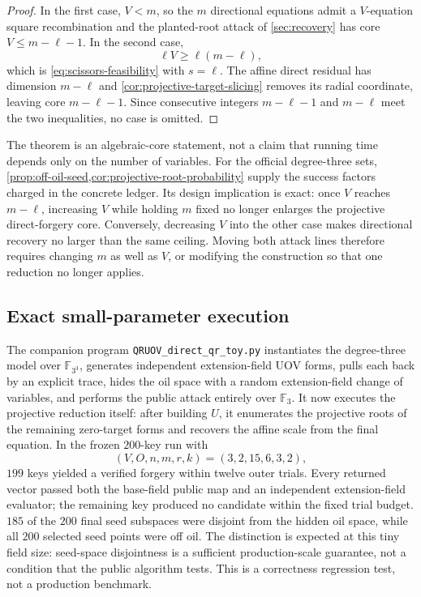 \documentclass[11pt,a4paper]{article}
\theoremstyle{definition}
\theoremstyle{remark}
\newcommand{\F}{\mathbb F}
\begin{document}
\begin{proof}
In the first case, $V<m$, so the $m$ directional equations admit a
$V$-equation square recombination and the planted-root attack of
\cref{sec:recovery} has core $V\le m-\ell-1$.  In the second case,
\[
 \ell V\ge\ell(m-\ell),
\]
which is \eqref{eq:scissors-feasibility} with $s=\ell$.  The affine direct
residual has dimension $m-\ell$ and
\cref{cor:projective-target-slicing} removes its radial coordinate, leaving
core $m-\ell-1$.  Since consecutive integers $m-\ell-1$ and $m-\ell$ meet the
two inequalities, no case is omitted.
\end{proof}

The theorem is an algebraic-core statement, not a claim that running time
depends only on the number of variables.  For the official degree-three sets,
\cref{prop:off-oil-seed,cor:projective-root-probability} supply the success
factors charged in the concrete ledger.  Its design implication is exact:
once $V$ reaches $m-\ell$, increasing $V$ while holding $m$ fixed no longer
enlarges the projective direct-forgery core.  Conversely, decreasing $V$ into
the other case makes directional recovery no larger than the same ceiling.
Moving both attack lines therefore requires changing $m$ as well as $V$, or
modifying the construction so that one reduction no longer applies.

\subsection{Exact small-parameter execution}
The companion program \texttt{QRUOV\_direct\_qr\_toy.py} instantiates the
degree-three model over $\F_{3^3}$, generates independent extension-field UOV
forms, pulls each back by an explicit trace, hides the oil space with a random
extension-field change of variables, and performs the public attack entirely
over $\F_3$.  It now executes the projective reduction itself: after building
$U$, it enumerates the projective roots of the remaining zero-target forms and
recovers the affine scale from the final equation.  In the frozen $200$-key run
with
\[
 (V,O,n,m,r,k)=(3,2,15,6,3,2),
\]
$199$ keys yielded a verified forgery within twelve outer trials.  Every
returned vector passed both the base-field public map and an independent
extension-field evaluator; the remaining key produced no candidate within the
fixed trial budget.  $185$ of the $200$ final seed subspaces were disjoint from
the hidden oil space, while all $200$ selected seed points were off oil.  The
distinction is expected at this tiny field size: seed-space disjointness is a
sufficient production-scale guarantee, not a condition that the public
algorithm tests.  This is a correctness regression test, not a production
benchmark.
\end{document}
